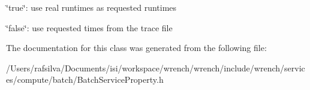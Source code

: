 \begin{DoxyItemize}
\item \char`\"{}true\char`\"{}\+: use real runtimes as requested runtimes
\item \char`\"{}false\char`\"{}\+: use requested times from the trace file 
\end{DoxyItemize}

The documentation for this class was generated from the following file\+:\begin{DoxyCompactItemize}
\item 
/\+Users/rafsilva/\+Documents/isi/workspace/wrench/wrench/include/wrench/services/compute/batch/Batch\+Service\+Property.\+h\end{DoxyCompactItemize}

